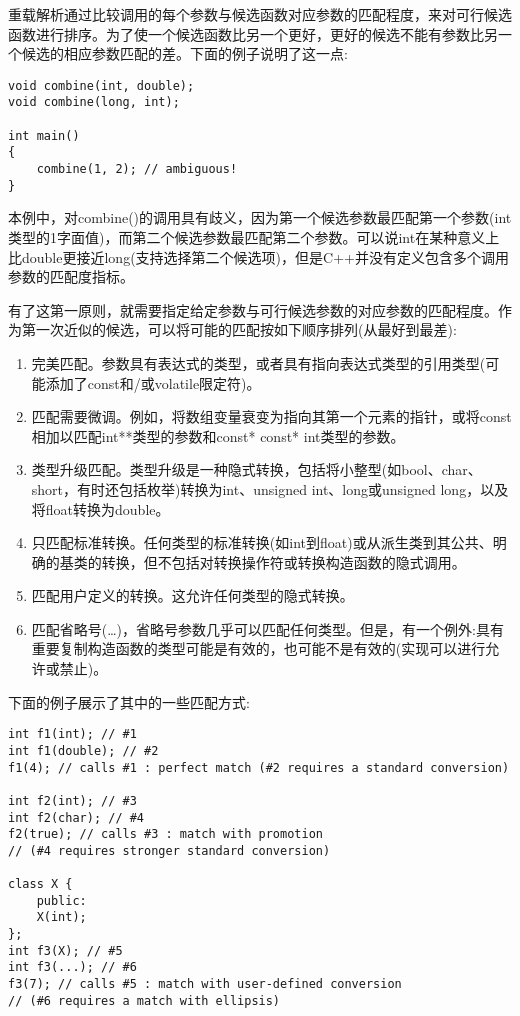 
重载解析通过比较调用的每个参数与候选函数对应参数的匹配程度，来对可行候选函数进行排序。为了使一个候选函数比另一个更好，更好的候选不能有参数比另一个候选的相应参数匹配的差。下面的例子说明了这一点:

\begin{lstlisting}[style=styleCXX]
void combine(int, double);
void combine(long, int);

int main()
{
	combine(1, 2); // ambiguous!
}
\end{lstlisting}

本例中，对combine()的调用具有歧义，因为第一个候选参数最匹配第一个参数(int类型的1字面值)，而第二个候选参数最匹配第二个参数。可以说int在某种意义上比double更接近long(支持选择第二个候选项)，但是C++并没有定义包含多个调用参数的匹配度指标。

有了这第一原则，就需要指定给定参数与可行候选参数的对应参数的匹配程度。作为第一次近似的候选，可以将可能的匹配按如下顺序排列(从最好到最差):

\begin{enumerate}
\item 
完美匹配。参数具有表达式的类型，或者具有指向表达式类型的引用类型(可能添加了const和/或volatile限定符)。

\item 
匹配需要微调。例如，将数组变量衰变为指向其第一个元素的指针，或将const相加以匹配int**类型的参数和const* const* int类型的参数。


\item 
类型升级匹配。类型升级是一种隐式转换，包括将小整型(如bool、char、short，有时还包括枚举)转换为int、unsigned int、long或unsigned long，以及将float转换为double。


\item 
只匹配标准转换。任何类型的标准转换(如int到float)或从派生类到其公共、明确的基类的转换，但不包括对转换操作符或转换构造函数的隐式调用。


\item 
匹配用户定义的转换。这允许任何类型的隐式转换。


\item 
匹配省略号(…)，省略号参数几乎可以匹配任何类型。但是，有一个例外:具有重要复制构造函数的类型可能是有效的，也可能不是有效的(实现可以进行允许或禁止)。
\end{enumerate}

下面的例子展示了其中的一些匹配方式:

\begin{lstlisting}[style=styleCXX]
int f1(int); // #1
int f1(double); // #2
f1(4); // calls #1 : perfect match (#2 requires a standard conversion)

int f2(int); // #3
int f2(char); // #4
f2(true); // calls #3 : match with promotion
// (#4 requires stronger standard conversion)

class X {
	public:
	X(int);
};
int f3(X); // #5
int f3(...); // #6
f3(7); // calls #5 : match with user-defined conversion
// (#6 requires a match with ellipsis)
\end{lstlisting}

